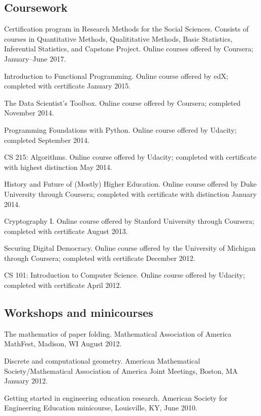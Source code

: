 \documentclass[letterpaper]{article}
\renewenvironment{itemize}{
  \begin{list}{}{
    \setlength{\leftmargin}{1.5em}
	\setlength{\itemsep}{0in}
  }
}{
  \end{list}
}
\begin{document}
\subsection*{Coursework}
\begin{itemize}
  \item Certification program in Research Methods for the Social Sciences. Consists of courses in Quantitative Methods, Qualititative Methods, Basic Statistics, Inferential Statistics, and Capstone Project. Online courses offered by Coursera; January--June 2017.
	\item Introduction to Functional Programming. Online course offered by edX; completed with certificate January 2015.
	\item The Data Scientist's Toolbox. Online course offered by Coursera; completed November 2014.
	\item Programming Foundations with Python. Online course offered by Udacity; completed September 2014.
	\item CS 215: Algorithms. Online course offered by Udacity; completed with certificate with highest distinction May 2014.
	\item History and Future of (Mostly) Higher Education. Online course offered by Duke University through Coursera; completed with certificate with distinction January 2014.
	\item Cryptography I. Online course offered by Stanford University through Coursera; completed with certificate August 2013.
	\item Securing Digital Democracy. Online course offered by the University of Michigan through Coursera; completed with certificate December 2012.
	\item CS 101: Introduction to Computer Science. Online course offered by Udacity; completed with certificate April 2012.
\end{itemize}


\subsection*{Workshops and minicourses}

\begin{itemize}
	\item The mathematics of paper folding. Mathematical Association of America MathFest, Madison, WI August 2012.
	\item Discrete and computational geometry. American Mathematical Society/Mathematical Association of America Joint Meetings, Boston, MA January 2012.
	\item Getting started in engineering education research. American Society for Engineering Education minicourse, Louisville, KY, June 2010.
\end{itemize}
\end{document}
